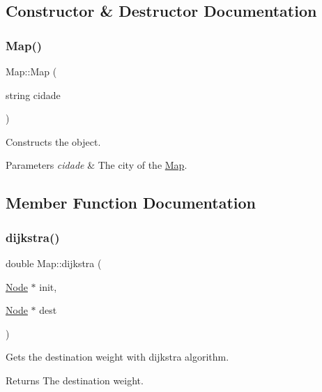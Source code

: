 \subsection{Constructor \& Destructor Documentation}
\mbox{\label{class_map_a5376d6db6b0115c9260976e44f2956a0}} 
\subsubsection{\texorpdfstring{Map()}{Map()}}
{\footnotesize\ttfamily Map\+::\+Map (\begin{DoxyParamCaption}\item[{string}]{cidade }\end{DoxyParamCaption})}



Constructs the object. 


\begin{DoxyParams}{Parameters}
{\em cidade} & The city of the \mbox{\hyperlink{class_map}{Map}}. \\
\hline
\end{DoxyParams}


\subsection{Member Function Documentation}
\mbox{\label{class_map_a2469775f1933123c570f9a0dbf0b60a6}} 
\subsubsection{\texorpdfstring{dijkstra()}{dijkstra()}}
{\footnotesize\ttfamily double Map\+::dijkstra (\begin{DoxyParamCaption}\item[{\mbox{\hyperlink{class_node}{Node}} $\ast$}]{init,  }\item[{\mbox{\hyperlink{class_node}{Node}} $\ast$}]{dest }\end{DoxyParamCaption})}



Gets the destination weight with dijkstra algorithm. 

\begin{DoxyReturn}{Returns}
The destination weight. 
\end{DoxyReturn}
\mbox{\label{class_map_a3483fdf07f62ab1522be688ad25c8675}} 
